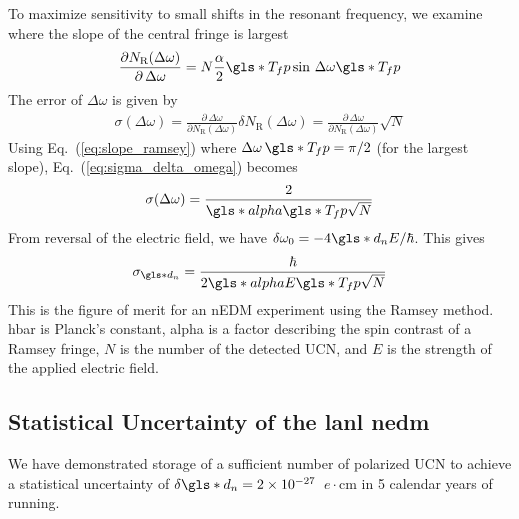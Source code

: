 To maximize sensitivity to small shifts in the resonant frequency, we examine where the slope of the central fringe is largest
%
\begin{gather}
    \frac{\partial N_\text{R}(\Delta \omega)}{\partial \, \Delta \omega} = N \frac{\alpha}{2} \gls*{T_fp} \sin \, \Delta \omega \gls*{T_fp} \label{eq:slope_ramsey}
\end{gather}
%
The error of $\Delta \omega$ is given by
%
\begin{gather}
    \sigma(\Delta \omega) = \frac{\partial \, \Delta \omega}{\partial N_\text{R}(\Delta \omega)}\delta N_\text{R}(\Delta \omega) = \frac{\partial \, \Delta \omega}{\partial N_\text{R}(\Delta \omega)} \sqrt{N}
    \label{eq:sigma_delta_omega}
\end{gather}
%
Using Eq.~(\ref{eq:slope_ramsey}) where $\Delta \omega \, \gls*{T_fp} = \pi/2$ (for the largest slope), Eq.~(\ref{eq:sigma_delta_omega}) becomes
%
\begin{gather}
    \sigma(\Delta \omega) = \frac{2}{\gls*{alpha} \gls*{T_fp} \sqrt{N}}
\end{gather}
%
From reversal of the electric field, we have $\delta \omega_0 = -4 \gls*{d_n} E / \hbar$.  This gives
%
\begin{gather}
    \sigma_{\gls*{d_n}} = \frac{\hbar}{2\gls*{alpha} E \gls*{T_fp} \sqrt{N}}\label{eq:figure_of_merit}
\end{gather}
%
This is the figure of merit for an nEDM experiment using the Ramsey method. \gls{hbar} is Planck’s constant, \gls{alpha} is a factor describing the spin contrast of a Ramsey fringe, $N$ is the number of the detected UCN, and $E$ is the strength of the applied electric field.


\subsection
{
    \texorpdfstring{Statistical Uncertainty of the \acrshort{lanl} \acrshort{nedm}}
                    {Statistical Uncertainty of the LANL nEDM}
}


We have demonstrated storage of a sufficient number of polarized UCN to achieve a statistical uncertainty of $\delta \gls*{d_n} = 2\times 10^{-27}$~$e\cdot\text{cm}$ in 5 calendar years of running.

